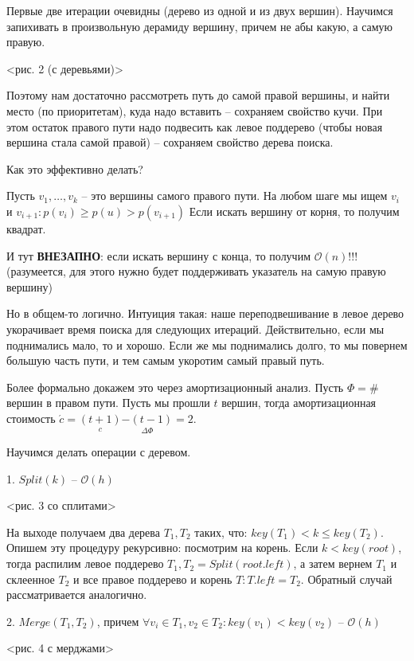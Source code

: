 \documentclass[fleqn, 12pt]{article}
\newcommand{\bigo}{\mathcal{O}}
\begin{document}
Первые две итерации очевидны (дерево из одной и из двух вершин). Научимся запихивать в произвольную дерамиду вершину, причем не абы какую, а самую правую.

<рис. 2 (с деревьями)>

Поэтому нам достаточно рассмотреть путь до самой правой вершины, и найти место (по приоритетам), куда надо вставить -- сохраняем свойство кучи. При этом остаток правого пути надо подвесить как левое поддерево (чтобы новая вершина стала самой правой) -- сохраняем свойство дерева поиска.

Как это эффективно делать?

Пусть $ v_1, \ldots , v_k $ -- это вершины самого правого пути. На любом шаге мы ищем $ v_i $ и $ v_{i + 1}  \colon  p(v_i) \geqslant p(u) > p(v_{i+1}) $
Если искать вершину от корня, то получим квадрат.

И тут \textbf{ВНЕЗАПНО}: если искать вершину с конца, то получим $ \bigo(n) $!!! (разумеется, для этого нужно будет поддерживать указатель на самую правую вершину)

Но в общем-то логично. Интуиция такая: наше переподвешивание в левое дерево укорачивает время поиска для следующих итераций. Действительно, если мы поднимались мало, то и хорошо. Если же мы поднимались долго, то мы повернем большую часть пути, и тем самым укоротим самый правый путь.

Более формально докажем это через амортизационный анализ. Пусть $ \Phi = \# $ вершин в правом пути. Пусть мы прошли $ t $ вершин, тогда амортизационная стоимость $ \acute{c} = \underset{c}{(t + 1)} \underset{\Delta \Phi }{-(t - 1)} = 2 $. 

\bigskip

Научимся делать операции с деревом.

1. $ Split (k) $ -- $ \bigo(h) $

<рис. 3 со сплитами>

На выходе получаем два дерева $ T_1, T_2 $ таких, что: $ key(T_1) < k \leqslant key(T_2) $. Опишем эту процедуру рекурсивно: посмотрим на корень. Если $ k < key(root) $, тогда распилим левое поддерево $ T_1, T_2 = Split (root.left) $, а затем вернем $ T_1 $ и склеенное $ T_2 $ и все правое поддерево и корень $ T: T.left = T_2 $. Обратный случай рассматривается аналогично.

2. $ Merge (T_1, T_2) $, причем $ \forall v_i \in T_1, v_2 \in T_2 \colon key(v_1) < key(v_2) $ -- $ \bigo(h) $

<рис. 4 с мерджами>
\end{document}
